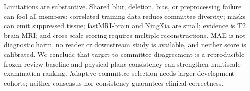 \documentclass{article}
\begin{document}
Limitations are substantive. Shared blur, deletion, bias, or preprocessing failure can fool all members; correlated training data reduce committee diversity; masks can omit suppressed tissue; fastMRI-brain and NingXia are small; evidence is T2 brain MRI; and cross-scale scoring requires multiple reconstructions. MAE is not diagnostic harm, no reader or downstream study is available, and neither score is calibrated. We conclude that target-to-committee disagreement is a reproducible frozen review baseline and physical-plane consistency can strengthen multiscale examination ranking. Adaptive committee selection needs larger development cohorts; neither consensus nor consistency guarantees clinical correctness.

\clearpage


\end{document}
